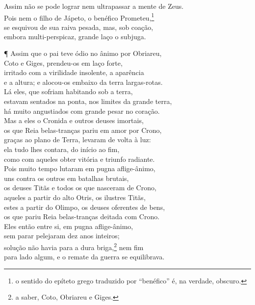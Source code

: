 \quad{}Assim não se pode lograr nem ultrapassar a mente de Zeus.\\
Pois nem o filho de Jápeto, o benéfico Prometeu,\footnote{o sentido do epíteto grego traduzido por ``benéfico'' é, na verdade, obscuro.}\\
se esquivou de sua raiva pesada, mas, sob coação, \\
embora multi-perspicaz, grande laço o subjuga.

¶ Assim que o pai teve ódio no ânimo por Obriareu,\\
Coto e Giges, prendeu-os em laço forte,\\
irritado com a virilidade insolente, a aparência\\
e a altura; e alocou-os embaixo da terra largas-rotas. \\
Lá eles, que sofriam habitando sob a terra,\\
estavam sentados na ponta, nos limites da grande terra,\\
há muito angustiados com grande pesar no coração.\\
Mas a eles o Cronida e outros deuses imortais,\\
os que Reia belas-tranças pariu em amor por Crono, \\
graças ao plano de Terra, levaram de volta à luz:\\
ela tudo lhes contara, do início ao fim,\\
como com aqueles obter vitória e triunfo radiante.\\
Pois muito tempo lutaram em pugna aflige-ânimo,\\
uns contra os outros em batalhas brutais, \\
os deuses Titãs e todos os que nasceram de Crono, \\
aqueles a partir do alto Otris, os ilustres Titãs, \\
estes a partir do Olimpo, os deuses oferentes de bens,\\
os que pariu Reia belas-tranças deitada com Crono.\\
Eles então entre si, em pugna aflige-ânimo, \\
sem parar pelejaram dez anos inteiros;\\
solução não havia para a dura briga,\footnote{a saber, Coto, Obriareu e Giges.} nem fim\\
para lado algum, e o remate da guerra se equilibrava.

